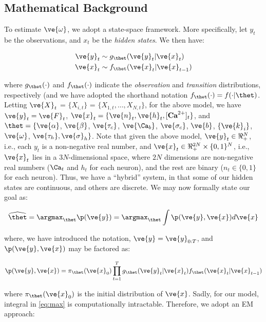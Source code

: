 \documentclass[12pt]{article}
\newcommand{\f}{f_{\thet}}
\newcommand{\g}{g_{\thet}}
\newcommand{\x}{\ve{x}}
\newcommand{\y}{\ve{y}}
\newcommand{\xT}{\x} %
\newcommand{\yT}{\y}
\newcommand{\ppi}{\pi_{\thet}}
\begin{document}
\subsection{Mathematical Background}

To estimate $\ve{\omega}$, we adopt a state-space framework.  More specifically, let $y_t$ be the observations, and $x_t$ be the \emph{hidden states}.   We then have:

\begin{align}
\y_t &\sim \g (\y_t | \x_t) \label{eq:y_t} \\
\x_t &\sim \f (\x_t | \x_{t-1}) \label{eq:x_t}
\end{align}

\noindent where $\g(\cdot)$ and $\f(\cdot)$ indicate the \emph{observation} and \emph{transition} distributions, respectively (and we have adopted the shorthand notation $\f(\cdot)=f(\cdot | \thet)$.  Letting $\ve{X}_t$ = $\{X_{i,t}\}$ = $\{X_{1,t}, \ldots, X_{N,t}\}$, for the above model, we have $\y_t=\ve{F}_t$, $\x_t=\{\ve{n}_t, \ve{h}_t, [\textbf{Ca}^{2+}]_t\}$, and $\thet=\{\ve{\alpha}$, $\ve{\beta}$, $\ve{\tau_c}$, $\ve{\Ca_b}$, $\ve{\sigma_c}$, $\ve{b}$, $\{\ve{k}_i\}$, $\ve{\omega}$, $\ve{\tau_h}, \ve{\sigma}_h\}$.   Note that given the above model, $\y_t \in \Re_+^N$, i.e., each $y_t$ is a non-negative real number, and $\x_t \in \Re_+^{2N} \times \{0,1\}^N$, i.e., $\x_t$ lies in a $3N$-dimensional space, where $2N$ dimensions are non-negative real numbers ($\Ca_t$ and $h_t$ for each neuron), and the rest are binary ($n_t \in \{0,1\}$ for each neuron).  Thus, we have a ``hybrid'' system, in that some of our hidden states are continuous, and others are discrete.  We may now formally state our goal as:

\begin{align} \label{eq:max}
\widehat{\thet} = \argmax_{\thet} \p(\yT) = \argmax_{\thet} \int \p(\yT, \xT) d\xT 
\end{align}

\noindent where, we have introduced the notation, $\yT=\y_{0:T}$, and $\p(\yT, \xT)$ may be factored as: 

\begin{align}
\p(\yT, \xT) = \ppi (\x_0) \prod_{t=1}^T \g(\y_t | \x_t) \f(\x_t | \x_{t-1}) 
\end{align}

\noindent where $\ppi(\x_0)$ is the initial distribution of $\x$.  Sadly, for our model, integral in \eqref{eq:max} is computationally intractable. Therefore, we adopt an EM approach:
\end{document}
